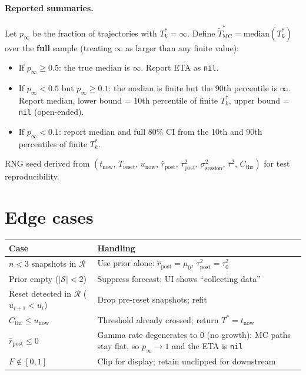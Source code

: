 \documentclass[11pt]{article}
\newcommand{\rpost}{\hat r_{\text{post}}}
\newcommand{\taupostsq}{\tau_{\text{post}}^2}
\newcommand{\tauzerosq}{\tau_0^2}
\newcommand{\sigsessionsq}{\sigma_{\text{session}}^2}
\newcommand{\unow}{u_{\text{now}}}
\newcommand{\tnow}{t_{\text{now}}}
\newcommand{\Treset}{T_{\text{reset}}}
\newcommand{\Cthr}{C_{\text{thr}}}
\newcommand{\Tstar}{T^\ast}
\newcommand{\Tstark}{T^\ast_k}
\begin{document}
\paragraph{Reported summaries.} Let $p_\infty$ be the fraction of
trajectories with $\Tstark = \infty$. Define $\tilde\Tstar_{\text{MC}} =
\mathrm{median}(\Tstark)$ over the \textbf{full} sample (treating $\infty$
as larger than any finite value):

\begin{itemize}
  \item If $p_\infty \geq 0.5$: the true median is $\infty$. Report ETA as
    \texttt{nil}.
  \item If $p_\infty < 0.5$ but $p_\infty \geq 0.1$: the median is finite
    but the 90th percentile is $\infty$. Report median, lower bound = 10th
    percentile of finite $\Tstark$, upper bound = \texttt{nil}
    (open-ended).
  \item If $p_\infty < 0.1$: report median and full 80\% CI from the 10th
    and 90th percentiles of finite $\Tstark$.
\end{itemize}

RNG seed derived from $(\tnow,\, \Treset,\, \unow,\, \rpost,\, \taupostsq,\,
\sigsessionsq,\, \bar\tau^2,\, \Cthr)$ for test reproducibility.

\section{Edge cases}

\begin{center}
\begin{tabular}{@{}p{}p{}@{}}
\toprule
Case & Handling \\
\midrule
$n < 3$ snapshots in $\mathcal{R}$
  & Use prior alone: $\rpost = \mu_0$, $\taupostsq = \tauzerosq$ \\
Prior empty ($\lvert\mathcal{S}\rvert < 2$)
  & Suppress forecast; UI shows ``collecting data'' \\
Reset detected in $\mathcal{R}$ ($u_{i+1} < u_i$)
  & Drop pre-reset snapshots; refit \\
$\Cthr \leq \unow$
  & Threshold already crossed; return $\Tstar = \tnow$ \\
$\rpost \leq 0$
  & Gamma rate degenerates to $0$ (no growth): MC paths stay flat, so
    $p_\infty \to 1$ and the ETA is \texttt{nil} \\
$F \notin [0, 1]$
  & Clip for display; retain unclipped for downstream \\
\bottomrule
\end{tabular}
\end{center}
\end{document}
